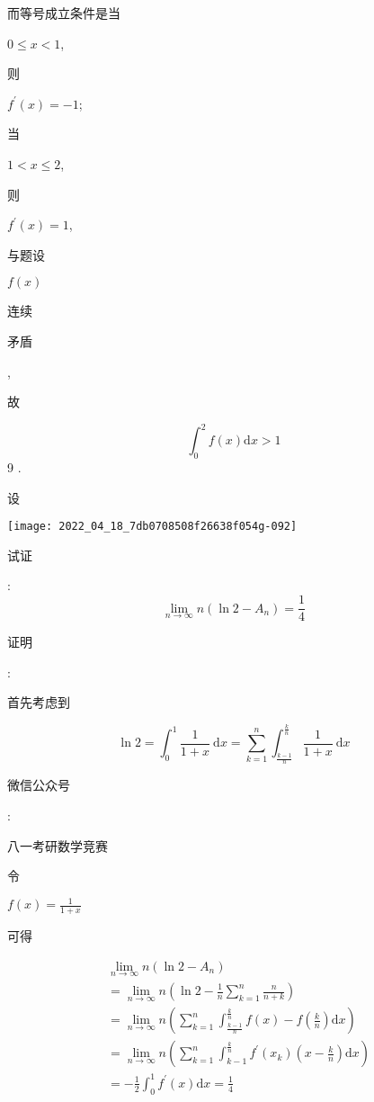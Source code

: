 \documentclass[10pt]{article}
\begin{document}
\begin{CJK}{UTF8}{mj}而等号成立条件是当\end{CJK} $0 \leq x<1$, \begin{CJK}{UTF8}{mj}则\end{CJK} $f^{\prime}(x)=-1$; \begin{CJK}{UTF8}{mj}当\end{CJK} $1<x \leq 2$, \begin{CJK}{UTF8}{mj}则\end{CJK} $f^{\prime}(x)=1$, \begin{CJK}{UTF8}{mj}与题设\end{CJK} $f(x)$ \begin{CJK}{UTF8}{mj}连续\end{CJK} \begin{CJK}{UTF8}{mj}矛盾\end{CJK}, \begin{CJK}{UTF8}{mj}故\end{CJK}
$$
\int_{0}^{2} f(x) \mathrm{d} x>1
$$
9 . \begin{CJK}{UTF8}{mj}设\end{CJK}

\texttt{[image: 2022\_04\_18\_7db0708508f26638f054g-092]}

\begin{CJK}{UTF8}{mj}试证\end{CJK}:
$$
\lim _{n \rightarrow \infty} n\left(\ln 2-A_{n}\right)=\frac{1}{4}
$$
\begin{CJK}{UTF8}{mj}证明\end{CJK}: \begin{CJK}{UTF8}{mj}首先考虑到\end{CJK}
$$
\ln 2=\int_{0}^{1} \frac{1}{1+x} \mathrm{~d} x=\sum_{k=1}^{n} \int_{\frac{k-1}{n}}^{\frac{k}{n}} \frac{1}{1+x} \mathrm{~d} x
$$
\begin{CJK}{UTF8}{mj}微信公众号\end{CJK}: \begin{CJK}{UTF8}{mj}八一考研数学竞赛\end{CJK} \begin{CJK}{UTF8}{mj}令\end{CJK} $f(x)=\frac{1}{1+x}$ \begin{CJK}{UTF8}{mj}可得\end{CJK}
$$
\begin{aligned}
&\lim _{n \rightarrow \infty} n\left(\ln 2-A_{n}\right) \\
&=\lim _{n \rightarrow \infty} n\left(\ln 2-\frac{1}{n} \sum_{k=1}^{n} \frac{n}{n+k}\right) \\
&=\lim _{n \rightarrow \infty} n\left(\sum_{k=1}^{n} \int_{\frac{k-1}{n}}^{\frac{k}{n}} f(x)-f\left(\frac{k}{n}\right) \mathrm{d} x\right) \\
&=\lim _{n \rightarrow \infty} n\left(\sum_{k=1}^{n} \int_{k-1}^{\frac{k}{n}} f^{\prime}\left(x_{k}\right)\left(x-\frac{k}{n}\right) \mathrm{d} x\right) \\
&=-\frac{1}{2} \int_{0}^{1} f^{\prime}(x) \mathrm{d} x=\frac{1}{4}
\end{aligned}
$$
\end{document}
